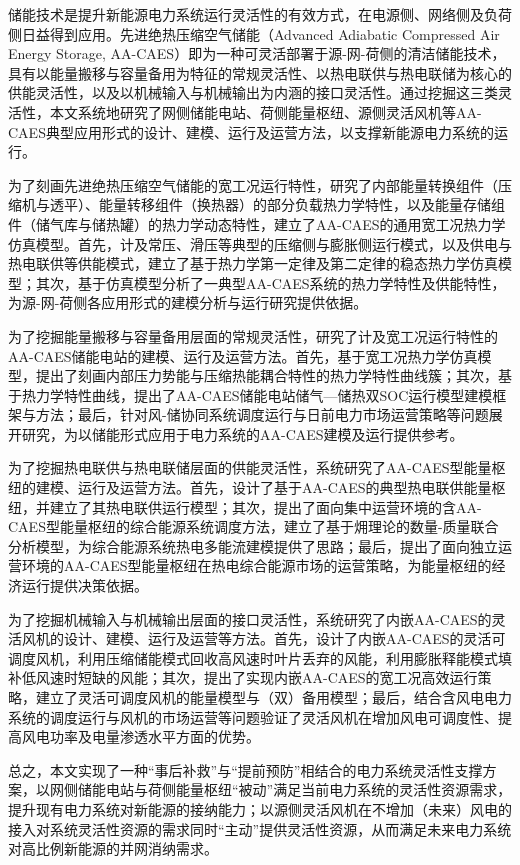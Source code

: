 \begin{cabstract}

储能技术是提升新能源电力系统运行灵活性的有效方式，在电源侧、网络侧及负荷侧日益得到应用。先进绝热压缩空气储能（Advanced Adiabatic Compressed Air Energy Storage, AA-CAES）即为一种可灵活部署于源-网-荷侧的清洁储能技术，具有以能量搬移与容量备用为特征的常规灵活性、以热电联供与热电联储为核心的供能灵活性，以及以机械输入与机械输出为内涵的接口灵活性。通过挖掘这三类灵活性，本文系统地研究了网侧储能电站、荷侧能量枢纽、源侧灵活风机等AA-CAES典型应用形式的设计、建模、运行及运营方法，以支撑新能源电力系统的运行。

为了刻画先进绝热压缩空气储能的宽工况运行特性，研究了内部能量转换组件（压缩机与透平）、能量转移组件（换热器）的部分负载热力学特性，以及能量存储组件（储气库与储热罐）的热力学动态特性，建立了AA-CAES的通用宽工况热力学仿真模型。首先，计及常压、滑压等典型的压缩侧与膨胀侧运行模式，以及供电与热电联供等供能模式，建立了基于热力学第一定律及第二定律的稳态热力学仿真模型；其次，基于仿真模型分析了一典型AA-CAES系统的热力学特性及供能特性，为源-网-荷侧各应用形式的建模分析与运行研究提供依据。

为了挖掘能量搬移与容量备用层面的常规灵活性，研究了计及宽工况运行特性的AA-CAES储能电站的建模、运行及运营方法。首先，基于宽工况热力学仿真模型，提出了刻画内部压力势能与压缩热能耦合特性的热力学特性曲线簇；其次，基于热力学特性曲线，提出了AA-CAES储能电站储气—储热双SOC运行模型建模框架与方法；最后，针对风-储协同系统调度运行与日前电力市场运营策略等问题展开研究，为以储能形式应用于电力系统的AA-CAES建模及运行提供参考。

为了挖掘热电联供与热电联储层面的供能灵活性，系统研究了AA-CAES型能量枢纽的建模、运行及运营方法。首先，设计了基于AA-CAES的典型热电联供能量枢纽，并建立了其热电联供运行模型；其次，提出了面向集中运营环境的含AA-CAES型能量枢纽的综合能源系统调度方法，建立了基于㶲理论的数量-质量联合分析模型，为综合能源系统热电多能流建模提供了思路；最后，提出了面向独立运营环境的AA-CAES型能量枢纽在热电综合能源市场的运营策略，为能量枢纽的经济运行提供决策依据。

为了挖掘机械输入与机械输出层面的接口灵活性，系统研究了内嵌AA-CAES的灵活风机的设计、建模、运行及运营等方法。首先，设计了内嵌AA-CAES的灵活可调度风机，利用压缩储能模式回收高风速时叶片丢弃的风能，利用膨胀释能模式填补低风速时短缺的风能；其次，提出了实现内嵌AA-CAES的宽工况高效运行策略，建立了灵活可调度风机的能量模型与（双）备用模型；最后，结合含风电电力系统的调度运行与风机的市场运营等问题验证了灵活风机在增加风电可调度性、提高风电功率及电量渗透水平方面的优势。

总之，本文实现了一种“事后补救”与“提前预防”相结合的电力系统灵活性支撑方案，以网侧储能电站与荷侧能量枢纽“被动”满足当前电力系统的灵活性资源需求，提升现有电力系统对新能源的接纳能力；以源侧灵活风机在不增加（未来）风电的接入对系统灵活性资源的需求同时“主动”提供灵活性资源，从而满足未来电力系统对高比例新能源的并网消纳需求。
\end{cabstract}


